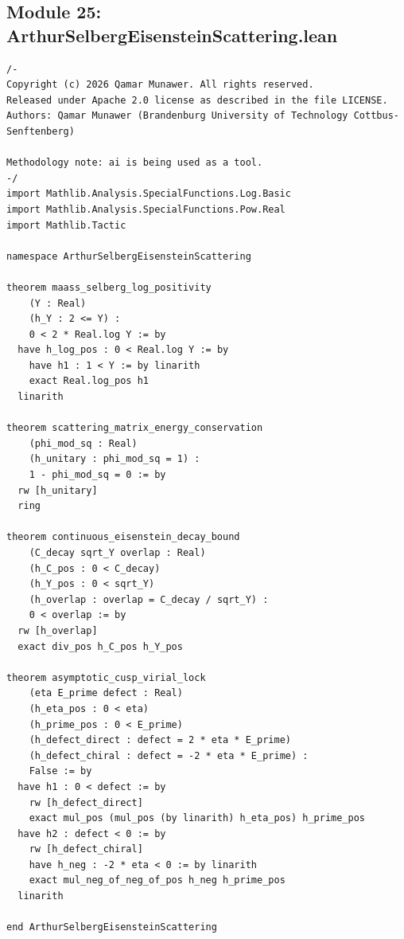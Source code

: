 \documentclass[11pt,a4paper]{article}
\begin{document}
\subsection*{Module 25: ArthurSelbergEisensteinScattering.lean}
\begin{lstlisting}[language=Lean4, caption={Arthur-Selberg Eisenstein Scattering Regularization (Module 25)}]
/-
Copyright (c) 2026 Qamar Munawer. All rights reserved.
Released under Apache 2.0 license as described in the file LICENSE.
Authors: Qamar Munawer (Brandenburg University of Technology Cottbus-Senftenberg)

Methodology note: ai is being used as a tool.
-/
import Mathlib.Analysis.SpecialFunctions.Log.Basic
import Mathlib.Analysis.SpecialFunctions.Pow.Real
import Mathlib.Tactic

namespace ArthurSelbergEisensteinScattering

theorem maass_selberg_log_positivity
    (Y : Real)
    (h_Y : 2 <= Y) :
    0 < 2 * Real.log Y := by
  have h_log_pos : 0 < Real.log Y := by
    have h1 : 1 < Y := by linarith
    exact Real.log_pos h1
  linarith

theorem scattering_matrix_energy_conservation
    (phi_mod_sq : Real)
    (h_unitary : phi_mod_sq = 1) :
    1 - phi_mod_sq = 0 := by
  rw [h_unitary]
  ring

theorem continuous_eisenstein_decay_bound
    (C_decay sqrt_Y overlap : Real)
    (h_C_pos : 0 < C_decay)
    (h_Y_pos : 0 < sqrt_Y)
    (h_overlap : overlap = C_decay / sqrt_Y) :
    0 < overlap := by
  rw [h_overlap]
  exact div_pos h_C_pos h_Y_pos

theorem asymptotic_cusp_virial_lock
    (eta E_prime defect : Real)
    (h_eta_pos : 0 < eta)
    (h_prime_pos : 0 < E_prime)
    (h_defect_direct : defect = 2 * eta * E_prime)
    (h_defect_chiral : defect = -2 * eta * E_prime) :
    False := by
  have h1 : 0 < defect := by
    rw [h_defect_direct]
    exact mul_pos (mul_pos (by linarith) h_eta_pos) h_prime_pos
  have h2 : defect < 0 := by
    rw [h_defect_chiral]
    have h_neg : -2 * eta < 0 := by linarith
    exact mul_neg_of_neg_of_pos h_neg h_prime_pos
  linarith

end ArthurSelbergEisensteinScattering
\end{lstlisting}
\end{document}
